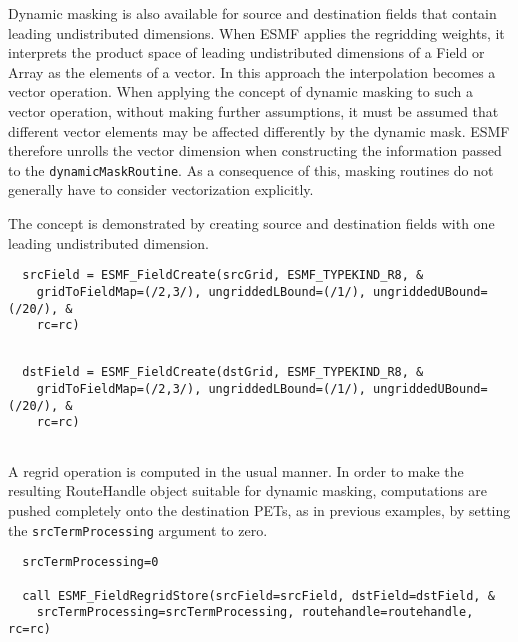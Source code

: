 
   Dynamic masking is also available for source and destination fields that
   contain leading undistributed dimensions. When ESMF applies the regridding
   weights, it interprets the product space of leading undistributed dimensions
   of a Field or Array as the elements of a vector. In this approach the 
   interpolation becomes a vector operation.  When applying the concept
   of dynamic masking to such a vector operation, without making further 
   assumptions, it must be assumed that different vector elements may be 
   affected differently by the dynamic mask. ESMF therefore unrolls the vector
   dimension when constructing the information passed to the
   {\tt dynamicMaskRoutine}. As a consequence of this, masking routines
   do not generally have to consider vectorization explicitly.
  
   The concept is demonstrated by creating source and destination fields
   with one leading undistributed dimension. 

 \begin{verbatim}
  srcField = ESMF_FieldCreate(srcGrid, ESMF_TYPEKIND_R8, &
    gridToFieldMap=(/2,3/), ungriddedLBound=(/1/), ungriddedUBound=(/20/), &
    rc=rc)
 
\end{verbatim}
 

 \begin{verbatim}
  dstField = ESMF_FieldCreate(dstGrid, ESMF_TYPEKIND_R8, &
    gridToFieldMap=(/2,3/), ungriddedLBound=(/1/), ungriddedUBound=(/20/), &
    rc=rc)
 
\end{verbatim}
 

   A regrid operation is computed in the usual manner. In order to make the
   resulting RouteHandle object suitable for dynamic masking, computations are
   pushed completely onto the destination PETs, as in previous examples, by
   setting the {\tt srcTermProcessing} argument to zero. 

 \begin{verbatim}
  srcTermProcessing=0

  call ESMF_FieldRegridStore(srcField=srcField, dstField=dstField, &
    srcTermProcessing=srcTermProcessing, routehandle=routehandle, rc=rc)
 
\end{verbatim}
 
